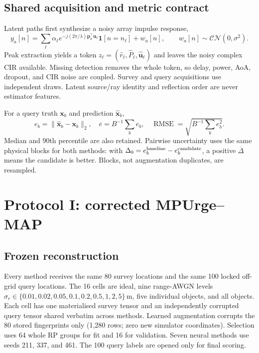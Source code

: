 \documentclass[10pt]{article}
\newcommand{\m}{\,\mathrm m}
\begin{document}
\subsection{Shared acquisition and metric contract}

Latent paths first synthesize a noisy array impulse response,
\begin{equation}
 y_a[n]=\sum_{\ell}\alpha_\ell
 e^{-j(2\pi/\lambda)\mathbf p_a^\top\mathbf u_\ell}
 \mathbf 1[n=n_\ell]+w_a[n],\qquad
 w_a[n]\sim\mathcal{CN}(0,\sigma^2).
\end{equation}
Peak extraction yields a token
$z_\ell=(\widehat r_\ell,\widehat P_\ell,\widehat{\mathbf u}_\ell)$
and leaves the noisy complex CIR available.  Missing detection removes the
whole token, so delay, power, AoA, dropout, and CIR noise are coupled.  Survey
and query acquisitions use independent draws.  Latent source/ray identity and
reflection order are never estimator features.

For a query truth $\mathbf x_b$ and prediction $\widehat{\mathbf x}_b$,
\begin{equation}
 e_b=\|\widehat{\mathbf x}_b-\mathbf x_b\|_2,\quad
 \overline e=B^{-1}\sum_b e_b,\quad
 \operatorname{RMSE}=\sqrt{B^{-1}\sum_b e_b^2}.
\end{equation}
Median and 90th percentile are also retained.  Pairwise uncertainty uses the
same physical blocks for both methods: with
$\Delta_b=e_b^{\rm baseline}-e_b^{\rm candidate}$, a positive
$\overline\Delta$ means the candidate is better.  Blocks, not augmentation
duplicates, are resampled.

\section{Protocol I: corrected MPUrge--MAP}

\subsection{Frozen reconstruction}

Every method receives the same 80 survey locations and the same 100 locked
off-grid query locations.  The 16 cells are ideal, nine range-AWGN levels
$\sigma_r\in\{0.01,0.02,0.05,0.1,0.2,0.5,1,2,5\}\m$, five individual
objects, and all objects.  Each cell has one materialised survey tensor and an
independently corrupted query tensor shared verbatim across methods.  Learned
augmentation corrupts the 80 stored fingerprints only (1,280 rows; zero new
simulator coordinates).  Selection uses 64 whole RP groups for fit and 16 for
validation.  Seven neural methods use seeds 211, 337, and 461.  The 100 query
labels are opened only for final scoring.
\end{document}
